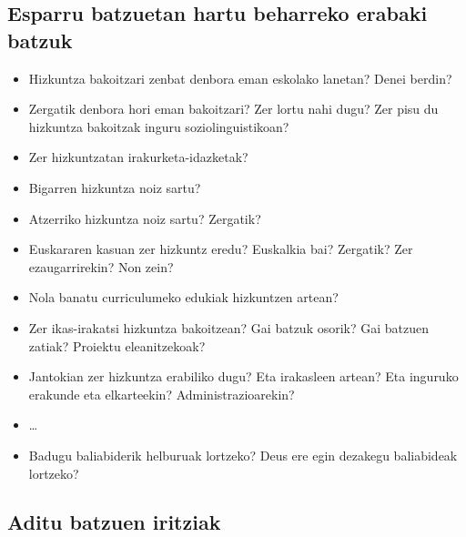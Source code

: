 \documentclass[
]{book}
\providecommand{\tightlist}{%
  \setlength{\itemsep}{0pt}\setlength{\parskip}{0pt}}
\begin{document}
\hypertarget{esparru-batzuetan-hartu-beharreko-erabaki-batzuk}{%
\subsection*{Esparru batzuetan hartu beharreko erabaki batzuk}\label{esparru-batzuetan-hartu-beharreko-erabaki-batzuk}}

\begin{itemize}
\tightlist
\item
  Hizkuntza bakoitzari zenbat denbora eman eskolako lanetan? Denei berdin?
\item
  Zergatik denbora hori eman bakoitzari? Zer lortu nahi dugu? Zer pisu du hizkuntza bakoitzak inguru soziolinguistikoan?
\item
  Zer hizkuntzatan irakurketa-idazketak?
\item
  Bigarren hizkuntza noiz sartu?
\item
  Atzerriko hizkuntza noiz sartu? Zergatik?
\item
  Euskararen kasuan zer hizkuntz eredu? Euskalkia bai? Zergatik? Zer ezaugarrirekin? Non zein?
\item
  Nola banatu curriculumeko edukiak hizkuntzen artean?
\item
  Zer ikas-irakatsi hizkuntza bakoitzean? Gai batzuk osorik? Gai batzuen zatiak? Proiektu eleanitzekoak?
\item
  Jantokian zer hizkuntza erabiliko dugu? Eta irakasleen artean? Eta inguruko erakunde eta elkarteekin? Administrazioarekin?
\item
  \ldots{}
\item
  Badugu baliabiderik helburuak lortzeko? Deus ere egin dezakegu baliabideak lortzeko?
\end{itemize}

\hypertarget{aditu-batzuen-iritziak}{%
\subsection{Aditu batzuen iritziak}\label{aditu-batzuen-iritziak}}
\end{document}
